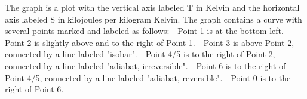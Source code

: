 The graph is a plot with the vertical axis labeled T in Kelvin and the horizontal axis labeled S in kilojoules per kilogram Kelvin. The graph contains a curve with several points marked and labeled as follows:
- Point 1 is at the bottom left.
- Point 2 is slightly above and to the right of Point 1.
- Point 3 is above Point 2, connected by a line labeled "isobar".
- Point 4/5 is to the right of Point 2, connected by a line labeled "adiabat, irreversible".
- Point 6 is to the right of Point 4/5, connected by a line labeled "adiabat, reversible".
- Point 0 is to the right of Point 6.